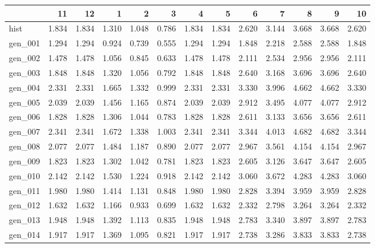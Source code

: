 \begin{tabular}{lrrrrrrrrrrrr}
\toprule
{} &     11 &     12 &     1  &     2  &     3  &     4  &     5  &     6  &     7  &     8  &     9  &     10 \\
\midrule
hist    &  1.834 &  1.834 &  1.310 &  1.048 &  0.786 &  1.834 &  1.834 &  2.620 &  3.144 &  3.668 &  3.668 &  2.620 \\
gen\_001 &  1.294 &  1.294 &  0.924 &  0.739 &  0.555 &  1.294 &  1.294 &  1.848 &  2.218 &  2.588 &  2.588 &  1.848 \\
gen\_002 &  1.478 &  1.478 &  1.056 &  0.845 &  0.633 &  1.478 &  1.478 &  2.111 &  2.534 &  2.956 &  2.956 &  2.111 \\
gen\_003 &  1.848 &  1.848 &  1.320 &  1.056 &  0.792 &  1.848 &  1.848 &  2.640 &  3.168 &  3.696 &  3.696 &  2.640 \\
gen\_004 &  2.331 &  2.331 &  1.665 &  1.332 &  0.999 &  2.331 &  2.331 &  3.330 &  3.996 &  4.662 &  4.662 &  3.330 \\
gen\_005 &  2.039 &  2.039 &  1.456 &  1.165 &  0.874 &  2.039 &  2.039 &  2.912 &  3.495 &  4.077 &  4.077 &  2.912 \\
gen\_006 &  1.828 &  1.828 &  1.306 &  1.044 &  0.783 &  1.828 &  1.828 &  2.611 &  3.133 &  3.656 &  3.656 &  2.611 \\
gen\_007 &  2.341 &  2.341 &  1.672 &  1.338 &  1.003 &  2.341 &  2.341 &  3.344 &  4.013 &  4.682 &  4.682 &  3.344 \\
gen\_008 &  2.077 &  2.077 &  1.484 &  1.187 &  0.890 &  2.077 &  2.077 &  2.967 &  3.561 &  4.154 &  4.154 &  2.967 \\
gen\_009 &  1.823 &  1.823 &  1.302 &  1.042 &  0.781 &  1.823 &  1.823 &  2.605 &  3.126 &  3.647 &  3.647 &  2.605 \\
gen\_010 &  2.142 &  2.142 &  1.530 &  1.224 &  0.918 &  2.142 &  2.142 &  3.060 &  3.672 &  4.283 &  4.283 &  3.060 \\
gen\_011 &  1.980 &  1.980 &  1.414 &  1.131 &  0.848 &  1.980 &  1.980 &  2.828 &  3.394 &  3.959 &  3.959 &  2.828 \\
gen\_012 &  1.632 &  1.632 &  1.166 &  0.933 &  0.699 &  1.632 &  1.632 &  2.332 &  2.798 &  3.264 &  3.264 &  2.332 \\
gen\_013 &  1.948 &  1.948 &  1.392 &  1.113 &  0.835 &  1.948 &  1.948 &  2.783 &  3.340 &  3.897 &  3.897 &  2.783 \\
gen\_014 &  1.917 &  1.917 &  1.369 &  1.095 &  0.821 &  1.917 &  1.917 &  2.738 &  3.286 &  3.833 &  3.833 &  2.738 \\

\end{tabular}
